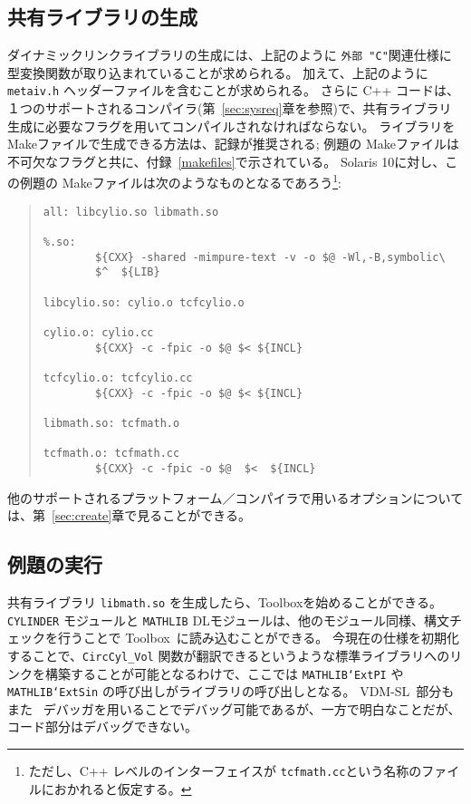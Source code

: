 \documentclass[\pformat,12pt]{jarticle}
\newcommand{\vdmslpp}{VDM-SL}
\newcommand{\Toolbox}{Toolbox}
\begin{document}
\subsection*{共有ライブラリの生成}

ダイナミックリンクライブラリの生成には、上記のように {\tt 外部 "C"}関連仕様に型変換関数が取り込まれていることが求められる。
加えて、上記のように{\tt metaiv.h} ヘッダーファイルを含むことが求められる。
さらに C++ コードは、１つのサポートされるコンパイラ(第~\ref{sec:sysreq}章を参照)で、共有ライブラリ生成に必要なフラグを用いてコンパイルされなければならない。 
ライブラリを Makeファイルで生成できる方法は、記録が推奨される; 例題の Makeファイルは不可欠なフラグと共に、付録~\ref{makefiles}で示されている。
Solaris 10に対し、この例題の Makeファイルは次のようなものとなるであろう\footnote{ただし、C++ レベルのインターフェイスが {\tt tcfmath.cc}という名称のファイルにおかれると仮定する。}:

\begin{quote}
\begin{verbatim}
all: libcylio.so libmath.so

%.so:
        ${CXX} -shared -mimpure-text -v -o $@ -Wl,-B,symbolic\
        $^  ${LIB}

libcylio.so: cylio.o tcfcylio.o 

cylio.o: cylio.cc
        ${CXX} -c -fpic -o $@ $< ${INCL}

tcfcylio.o: tcfcylio.cc
        ${CXX} -c -fpic -o $@ $< ${INCL}

libmath.so: tcfmath.o

tcfmath.o: tcfmath.cc
        ${CXX} -c -fpic -o $@  $<  ${INCL}
\end{verbatim}
\end{quote}

他のサポートされるプラットフォーム／コンパイラで用いるオプションについては、第~\ref{sec:create}章で見ることができる。

\subsection*{例題の実行}

共有ライブラリ {\tt libmath.so} を生成したら、Toolboxを始めることができる。
{\tt CYLINDER} モジュールと {\tt MATHLIB} DLモジュールは、他のモジュール同様、構文チェックを行うことで \Toolbox\ に読み込むことができる。 
今現在の仕様を初期化することで、{\tt CircCyl\_Vol} 関数が翻訳できるというような標準ライブラリへのリンクを構築することが可能となるわけで、ここでは {\tt MATHLIB`ExtPI} や{\tt MATHLIB`ExtSin} の呼び出しがライブラリの呼び出しとなる。 \vdmslpp\ 部分もまた \VDMTools\ デバッガを用いることでデバッグ可能であるが、一方で明白なことだが、コード部分はデバッグできない。
\end{document}
